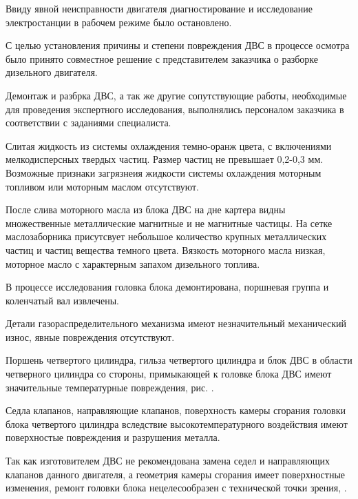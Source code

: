 Ввиду явной неисправности двигателя диагностирование и исследование электростанции в рабочем режиме было остановлено. 


С целью установления причины и степени повреждения ДВС в процессе осмотра было принято совместное решение с представителем заказчика о разборке дизельного двигателя.


Демонтаж и разбрка ДВС, а так же  другие сопутствующие работы, необходимые для проведения экспертного исследования, выполнялись персоналом заказчика  в соответствии с заданиями специалиста.  

Слитая жидкость из системы охлаждения темно-оранж цвета, с включениями мелкодисперсных твердых частиц. Размер частиц не превышает 0,2-0,3 мм. Возможные признаки загрязнеия жидкости  системы охлаждения  моторным топливом или моторным маслом отсутствуют.  

После слива моторного масла из блока ДВС на дне картера видны множественные   металлические  магнитные и не магнитные  частицы. На сетке маслозаборника присутсвует небольшое количество крупных металлических частиц и частиц вещества темного цвета. Вязкость моторного масла низкая, моторное масло с характерным запахом дизельного топлива.



В процессе исследования головка блока демонтирована, поршневая группа и коленчатый вал извлечены. 

Детали газораспределительного механизма имеют незначительный механический  износ, явные повреждения  отсутствуют.

Поршень четвертого цилиндра, гильза четвертого цилиндра  и блок ДВС в области четверного цилиндра со стороны, примыкающей к головке блока ДВС имеют значительные температурные повреждения, рис. \cite{Kolbenschmidt}.

Седла клапанов, направляющие клапанов, поверхность камеры сгорания головки блока четвертого цилиндра вследствие высокотемпературного воздействия имеют поверхностые повреждения и разрушения металла.  

Так как изготовителем ДВС не рекомендована замена седел и направляющих клапанов данного двигателя, а геометрия камеры сгорания имеет поверхностные изменения,  ремонт головки блока нецелесообразен с технической точки зрения, \cite{Y4100/Y4102}.



